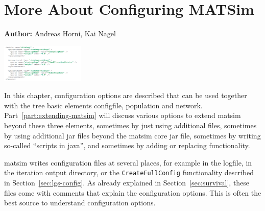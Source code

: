 \chapter{More About Configuring MATSim}
\label{ch:configuring}

\hfill \textbf{Author:} Andreas Horni, Kai Nagel

\begin{center} \includegraphics[width=0.3\textwidth, angle=0]{using/figures/strategy.png} \end{center}

In this chapter, configuration options are described that can be used together with the tree basic elements \gls{configfile}, population and network.
%
Part~\ref{part:extending-matsim} will discuss various options to extend \gls{matsim} beyond these three elements, sometimes by just using additional files, sometimes by using additional \gls{jar} files beyond the \gls{matsim} core \gls{jar} file,  sometimes by writing so-called ``scripts in \gls{java}'', and sometimes by adding or replacing functionality.

\gls{matsim} writes configuration files at several places, for example in the logfile, in the iteration output directory, or the \lstinline{CreateFullConfig} functionality described in Section~\ref{sec:lgs-config}.  As already explained in Section~\ref{sec:survival}, these files come with comments that explain the configuration options.  This is often the best source to understand configuration options.  %

